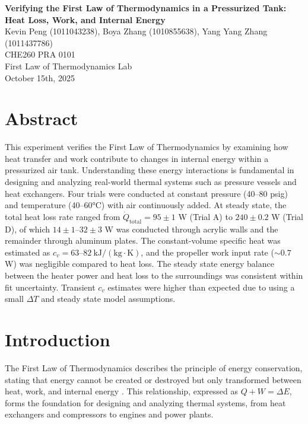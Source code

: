 \documentclass[12pt]{article}
\begin{document}
\begin{center}
\textbf{\Large Verifying the First Law of Thermodynamics in a Pressurized Tank: Heat Loss, Work, and Internal Energy} \\[0.5em]
Kevin Peng (1011043238), Boya Zhang (1010855638), Yang Yang Zhang (1011437786)\\[0.5em]
CHE260 PRA 0101 \\
First Law of Thermodynamics Lab \\
October 15th, 2025 \\
\end{center}

\section*{Abstract}
This experiment verifies the First Law of Thermodynamics by examining how heat transfer and work contribute to changes in internal energy within a pressurized air tank. 
Understanding these energy interactions is fundamental in designing and analyzing real-world thermal systems such as pressure vessels and heat exchangers.
Four trials were conducted at constant pressure (40--80 psig) and temperature (40--60°C) with air continuously added. 
At steady state, the total heat loss rate ranged from $\dot{Q}_{\text{total}} = 95 \pm 1$ W (Trial A) to $240 \pm 0.2$ W (Trial D), of which $14 \pm 1$--$32 \pm 3$ W was conducted through acrylic walls and the remainder through aluminum plates. 
The constant-volume specific heat was estimated as $c_v = 63$--$82~\mathrm{kJ/(kg \cdot K)}$, and the propeller work input rate ($\sim 0.7$ W) was negligible compared to heat loss.
The steady state energy balance between the heater power and heat loss to the surroundings was consistent within fit uncertainty.
Transient $c_v$ estimates were higher than expected due to using a small $\Delta T$ and steady state model assumptions.

\section*{Introduction}
The First Law of Thermodynamics describes the principle of energy conservation, stating that energy cannot be created or destroyed but only transformed between heat, work, and internal energy \cite{che260_manual}. 
This relationship, expressed as $Q + W = \Delta E$, forms the foundation for designing and analyzing thermal systems, from heat exchangers and compressors to engines and power plants.
\end{document}
